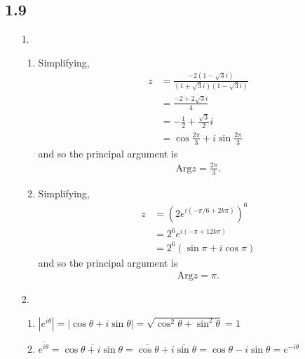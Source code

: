\documentclass[a4paper,12pt]{article}
\begin{document}
\subsection*{1.9}
\begin{enumerate}
    \item[1.]
        \begin{enumerate}
            \item
                Simplifying,
                \begin{align*}
                    z &= \frac{-2(1 - \sqrt{3}i)}{(1 + \sqrt{3}i)(1 - \sqrt{3}i)} \\
                    &= \frac{-2 + 2\sqrt{3}i}{4} \\
                    &= -\frac{1}{2} + \frac{\sqrt{3}}{2}i \\
                    &= \cos\frac{2\pi}{3} + i\sin\frac{2\pi}{3}
                \end{align*}
                and so the principal argument is
                \begin{align*}
                    \text{Arg}z = \frac{2\pi}{3}.
                \end{align*}

            \item
                Simplifying,
                \begin{align*}
                    z &= \left( 2e^{i(-\pi/6 + 2k\pi)} \right)^6 \\
                    &= 2^6 e^{i(-\pi + 12k\pi)} \\
                    &= 2^6(\sin\pi + i\cos\pi)
                \end{align*}
                and so the principal argument is
                \begin{align*}
                    \text{Arg}z = \pi.
                \end{align*}
        \end{enumerate}

    \item[2.]
        \begin{enumerate}
            \item
                $|e^{i\theta}| = |\cos\theta + i\sin\theta| = \sqrt{\cos^2\theta + \sin^2\theta} = 1$

            \item
                $\overline{e^{i\theta}} = \overline{\cos\theta + i\sin\theta} = \overline{\cos\theta} + \overline{i\sin\theta} = \cos\theta - i\sin\theta = e^{-i\theta}$
        \end{enumerate}


\end{enumerate}
\end{document}
